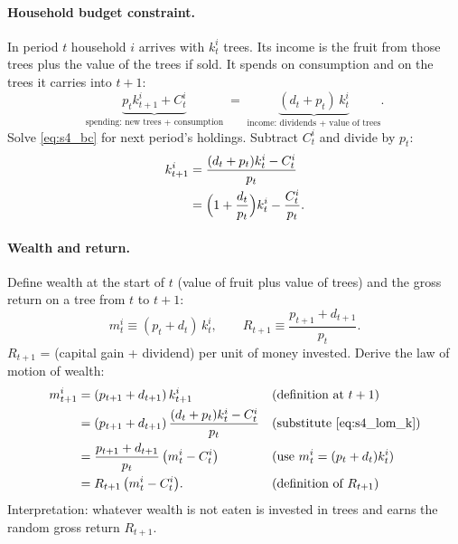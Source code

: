 \paragraph{Household budget constraint.}
In period $t$ household $i$ arrives with $k^i_t$ trees. Its income is the fruit from those trees plus the value of the trees if sold. It spends on consumption and on the trees it carries into $t+1$:
\begin{equation}\label{eq:s4_bc}
  \underbrace{p_t k^i_{t+1} + C^i_t}_{\text{spending: new trees + consumption}}
  \;=\;
  \underbrace{(d_t + p_t)\,k^i_t}_{\text{income: dividends + value of trees}} .
\end{equation}
Solve \eqref{eq:s4_bc} for next period's holdings. Subtract $C^i_t$ and divide by $p_t$:
\begin{align}
  k^i_{t+1} &= \frac{(d_t+p_t)k^i_t - C^i_t}{p_t} \notag\\
            &= \Big(1+\frac{d_t}{p_t}\Big)k^i_t - \frac{C^i_t}{p_t}. \label{eq:s4_lom_k}
\end{align}

\paragraph{Wealth and return.}
Define wealth at the start of $t$ (value of fruit plus value of trees) and the gross return on a tree from $t$ to $t+1$:
\begin{equation}\label{eq:s4_def_mR}
  m^i_t \equiv (p_t+d_t)\,k^i_t,
  \qquad
  R_{t+1} \equiv \frac{p_{t+1}+d_{t+1}}{p_t}.
\end{equation}
$R_{t+1}$ = (capital gain + dividend) per unit of money invested. Derive the law of motion of wealth:
\begin{align}
  m^i_{t+1} &= (p_{t+1}+d_{t+1})\,k^i_{t+1} && \text{(definition at $t+1$)}\notag\\
  &= (p_{t+1}+d_{t+1})\,\frac{(d_t+p_t)k^i_t - C^i_t}{p_t} && \text{(substitute \eqref{eq:s4_lom_k})}\notag\\
  &= \frac{p_{t+1}+d_{t+1}}{p_t}\,\big(m^i_t - C^i_t\big) && \text{(use $m^i_t=(p_t+d_t)k^i_t$)}\notag\\
  &= R_{t+1}\,\big(m^i_t - C^i_t\big). && \text{(definition of $R_{t+1}$)} \label{eq:s4_lom_m}
\end{align}
Interpretation: whatever wealth is not eaten is invested in trees and earns the random gross return $R_{t+1}$.

